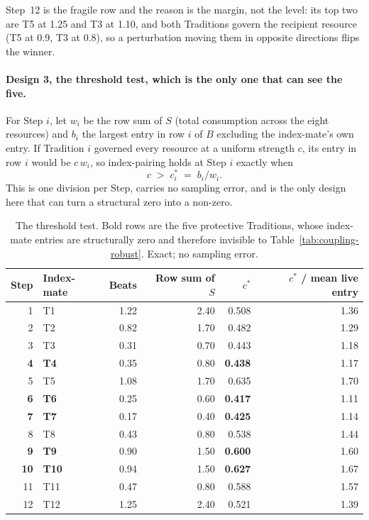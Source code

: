 \documentclass[11pt,a4paper]{article}
\begin{document}
Step~12 is the fragile row and the reason is the margin, not the level: its top
two are T5 at 1.25 and T3 at 1.10, and both Traditions govern the recipient
resource (T5 at 0.9, T3 at 0.8), so a perturbation moving them in opposite
directions flips the winner.

\paragraph{Design 3, the threshold test, which is the only one that can see the
five.} For Step $i$, let $w_i$ be the row sum of $S$ (total consumption across the
eight resources) and $b_i$ the largest entry in row $i$ of $B$ excluding the
index-mate's own entry. If Tradition $i$ governed every resource at a uniform
strength $c$, its entry in row $i$ would be $c\,w_i$, so index-pairing holds at
Step $i$ exactly when
\begin{equation}
c \;>\; c^{*}_i \;=\; b_i / w_i .
\end{equation}
This is one division per Step, carries no sampling error, and is the only design
here that can turn a structural zero into a non-zero.

\begin{table}[htbp]\centering\small
\begin{tabular}{@{}rlrrrr@{}}
\toprule
Step & Index-mate & Beats & Row sum of $S$ & $c^{*}$ & $c^{*}$ / mean live entry \\
\midrule
1 & T1 & 1.22 & 2.40 & 0.508 & 1.36 \\
2 & T2 & 0.82 & 1.70 & 0.482 & 1.29 \\
3 & T3 & 0.31 & 0.70 & 0.443 & 1.18 \\
\textbf{4} & \textbf{T4} & 0.35 & 0.80 & \textbf{0.438} & 1.17 \\
5 & T5 & 1.08 & 1.70 & 0.635 & 1.70 \\
\textbf{6} & \textbf{T6} & 0.25 & 0.60 & \textbf{0.417} & 1.11 \\
\textbf{7} & \textbf{T7} & 0.17 & 0.40 & \textbf{0.425} & 1.14 \\
8 & T8 & 0.43 & 0.80 & 0.538 & 1.44 \\
\textbf{9} & \textbf{T9} & 0.90 & 1.50 & \textbf{0.600} & 1.60 \\
\textbf{10} & \textbf{T10} & 0.94 & 1.50 & \textbf{0.627} & 1.67 \\
11 & T11 & 0.47 & 0.80 & 0.588 & 1.57 \\
12 & T12 & 1.25 & 2.40 & 0.521 & 1.39 \\
\bottomrule
\end{tabular}
\caption{The threshold test. Bold rows are the five protective Traditions, whose
index-mate entries are structurally zero and therefore invisible to
Table~\ref{tab:coupling-robust}. Exact; no sampling error.}
\label{tab:threshold}
\end{table}
\end{document}
